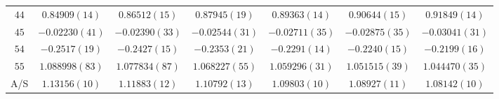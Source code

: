 \begin{table}
\begin{center}
\begin{tabular}{c|c c c c c c}
$44$ & $0.84909(14)$ & $0.86512(15)$ & $0.87945(19)$ & $0.89363(14)$ & $0.90644(15)$ & $0.91849(14)$ \\
$45$ & $-0.02230(41)$ & $-0.02390(33)$ & $-0.02544(31)$ & $-0.02711(35)$ & $-0.02875(35)$ & $-0.03041(31)$ \\
$54$ & $-0.2517(19)$ & $-0.2427(15)$ & $-0.2353(21)$ & $-0.2291(14)$ & $-0.2240(15)$ & $-0.2199(16)$ \\
$55$ & $1.088998(83)$ & $1.077834(87)$ & $1.068227(55)$ & $1.059296(31)$ & $1.051515(39)$ & $1.044470(35)$ \\
\hline
A/S & $1.13156(10)$ & $1.11883(12)$ & $1.10792(13)$ & $1.09803(10)$ & $1.08927(11)$ & $1.08142(10)$ \\
\hline
\hline
\end{tabular}
\end{center}
\end{table}